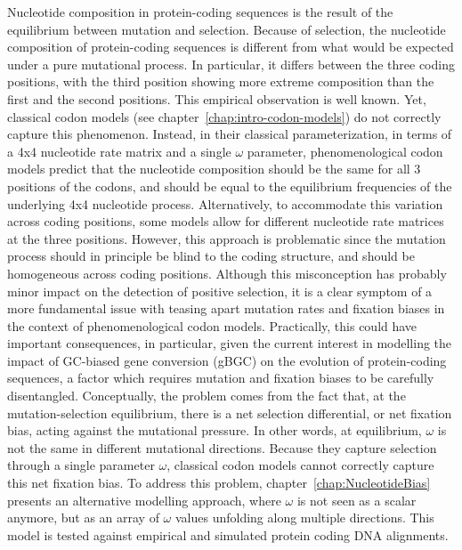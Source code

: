 Nucleotide composition in protein-coding sequences is the result of the equilibrium between mutation and selection.
Because of selection, the nucleotide composition of protein-coding sequences is different from what would be expected under a pure mutational process.
In particular, it differs between the three coding positions, with the third position showing more extreme composition than the first and the second positions.
This empirical observation is well known.
Yet, classical \gls{codon} models (see chapter~\ref{chap:intro-codon-models}) do not correctly capture this phenomenon.
Instead, in their classical parameterization, in terms of a 4x4 nucleotide rate matrix and a single $\omega$ parameter, phenomenological \gls{codon} models predict that the nucleotide composition should be the same for all $3$ positions of the \glspl{codon}, and should be equal to the equilibrium frequencies of the underlying 4x4 nucleotide process.
Alternatively, to accommodate this variation across coding positions, some models allow for different nucleotide rate matrices at the three positions.
However, this approach is problematic since the mutation process should in principle be blind to the coding structure, and should be homogeneous across coding positions.
Although this misconception has probably minor impact on the detection of positive selection, it is a clear symptom of a more fundamental issue with teasing apart mutation rates and fixation biases in the context of phenomenological \gls{codon} models.
Practically, this could have important consequences, in particular, given the current interest in modelling the impact of \gls{GC-biased gene conversion} (\acrshort{gBGC}) on the evolution of protein-coding sequences, a factor which requires mutation and fixation biases to be carefully disentangled.
Conceptually, the problem comes from the fact that, at the mutation-selection equilibrium, there is a net selection differential, or net fixation bias, acting against the mutational pressure.
In other words, at equilibrium, $\omega$ is not the same in different mutational directions.
Because they capture selection through a single parameter $\omega$, classical \gls{codon} models cannot correctly capture this net fixation bias.
To address this problem, chapter~\ref{chap:NucleotideBias} presents an alternative modelling approach, where $\omega$ is not seen as a scalar anymore, but as an array of $\omega$ values unfolding along multiple directions.
This model is tested against empirical and simulated protein coding \acrshort{DNA} alignments.



